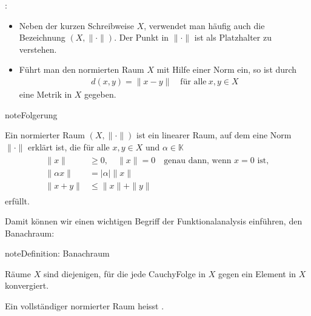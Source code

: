 \documentclass[letterpaper,10pt,english]{jupyterBook}
\begin{document}
:
\begin{itemize}
\item {} 
Neben der kurzen Schreibweise \(X\), verwendet man häufig auch die Bezeichnung \((X, \|\cdot\|)\). Der Punkt in \(\|\cdot\|\) ist als Platzhalter zu verstehen.

\item {} 
Führt man den normierten Raum \(X\) mit Hilfe einer Norm ein, so ist durch
\begin{equation*}
\begin{split}d(x,y) = \|x-y\|\quad\text{für alle}\ x,y\in X\end{split}
\end{equation*}
eine Metrik in \(X\) gegeben.

\end{itemize}

\begin{sphinxadmonition}{note}{Folgerung}

Ein normierter Raum \((X, \|\cdot\|)\) ist ein linearer Raum, auf dem eine Norm \(\|\cdot\|\) erklärt ist, die für alle \(x,y\in X\) und \(\alpha \in \mathbb{K}\)
\begin{equation*}
\begin{split}\begin{split}
\|x\| & \ge 0,\quad \|x\|=0\quad \text{genau dann, wenn $x=0$ ist},\\
\|\alpha x\| & = |\alpha| \|x\|\\
\|x + y\| & \le \|x\| + \|y\|\end{split}\end{split}
\end{equation*}
erfüllt.
\end{sphinxadmonition}

Damit können wir einen wichtigen Begriff der Funktionalanalysis einführen, den Banachraum:

\begin{sphinxadmonition}{note}{Definition: Banachraum}

 Räume \(X\) sind diejenigen, für die jede Cauchy\sphinxhyphen{}Folge in \(X\) gegen ein Element in \(X\) konvergiert.

Ein vollständiger normierter Raum heisst .
\end{sphinxadmonition}
\end{document}
